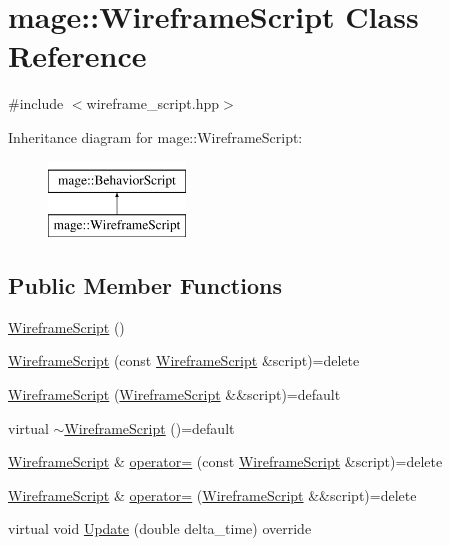 \hypertarget{classmage_1_1_wireframe_script}{}\section{mage\+:\+:Wireframe\+Script Class Reference}
\label{classmage_1_1_wireframe_script}


{\ttfamily \#include $<$wireframe\+\_\+script.\+hpp$>$}

Inheritance diagram for mage\+:\+:Wireframe\+Script\+:\begin{figure}[H]
\begin{center}
\leavevmode
\includegraphics[height=2.000000cm]{classmage_1_1_wireframe_script}
\end{center}
\end{figure}
\subsection*{Public Member Functions}
\begin{DoxyCompactItemize}
\item 
\hyperlink{classmage_1_1_wireframe_script_a3dc73b04bdab31e19b46360bfe5f4766}{Wireframe\+Script} ()
\item 
\hyperlink{classmage_1_1_wireframe_script_abd35f16fba0de4d370728e832d757473}{Wireframe\+Script} (const \hyperlink{classmage_1_1_wireframe_script}{Wireframe\+Script} \&script)=delete
\item 
\hyperlink{classmage_1_1_wireframe_script_a60fe0f3e02061654466c22d81919e6e1}{Wireframe\+Script} (\hyperlink{classmage_1_1_wireframe_script}{Wireframe\+Script} \&\&script)=default
\item 
virtual \hyperlink{classmage_1_1_wireframe_script_a0b6f33e5938125f915152fd9100625d6}{$\sim$\+Wireframe\+Script} ()=default
\item 
\hyperlink{classmage_1_1_wireframe_script}{Wireframe\+Script} \& \hyperlink{classmage_1_1_wireframe_script_a0382415dade9f889b1edebf2ee5aa770}{operator=} (const \hyperlink{classmage_1_1_wireframe_script}{Wireframe\+Script} \&script)=delete
\item 
\hyperlink{classmage_1_1_wireframe_script}{Wireframe\+Script} \& \hyperlink{classmage_1_1_wireframe_script_a6be79bd5b62f7cf6e9d1237dba0a5bdc}{operator=} (\hyperlink{classmage_1_1_wireframe_script}{Wireframe\+Script} \&\&script)=delete
\item 
virtual void \hyperlink{classmage_1_1_wireframe_script_af077736607ad22f66d8553066af51760}{Update} (double delta\+\_\+time) override
\end{DoxyCompactItemize}
